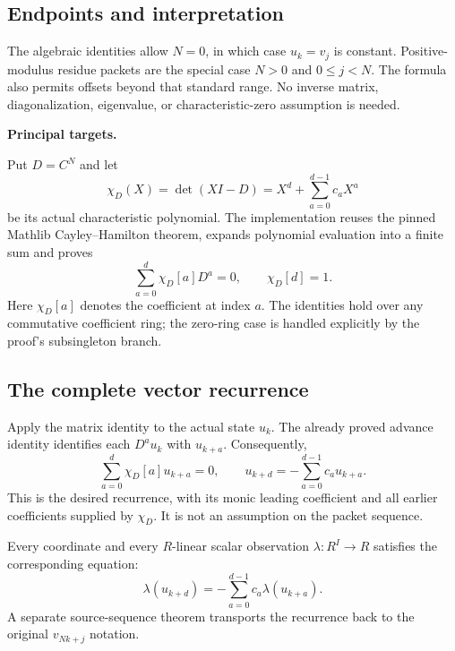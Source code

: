 \subsection*{Endpoints and interpretation}
The algebraic identities allow $N=0$, in which case $u_k=v_j$ is constant. Positive-modulus residue packets are the special case $N>0$ and $0\le j<N$. The formula also permits offsets beyond that standard range. No inverse matrix, diagonalization, eigenvalue, or characteristic-zero assumption is needed.

\textbf{Principal targets.}\par
{}\par
{}\par
{}\par
{}
\par\medskip
{}
Put $D=C^N$ and let
\[
 \chi_D(X)=\det(XI-D)=X^d+\sum_{a=0}^{d-1}c_aX^a
\]
be its actual characteristic polynomial. The implementation reuses the pinned Mathlib Cayley--Hamilton theorem, expands polynomial evaluation into a finite sum and proves
\[
 \sum_{a=0}^{d}\chi_D[a]D^a=0,
 \qquad \chi_D[d]=1.
\]
Here $\chi_D[a]$ denotes the coefficient at index $a$. The identities hold over any commutative coefficient ring; the zero-ring case is handled explicitly by the proof's subsingleton branch.

\subsection*{The complete vector recurrence}
Apply the matrix identity to the actual state $u_k$. The already proved advance identity identifies each $D^a u_k$ with $u_{k+a}$. Consequently,
\[
 \sum_{a=0}^{d}\chi_D[a]u_{k+a}=0,
 \qquad
 \boxed{u_{k+d}=-\sum_{a=0}^{d-1}c_a u_{k+a}.}
\]
This is the desired recurrence, with its monic leading coefficient and all earlier coefficients supplied by $\chi_D$. It is not an assumption on the packet sequence.

Every coordinate and every $R$-linear scalar observation $\lambda:R^I\to R$ satisfies the corresponding equation:
\[
 \lambda(u_{k+d})=-\sum_{a=0}^{d-1}c_a\lambda(u_{k+a}).
\]
A separate source-sequence theorem transports the recurrence back to the original $v_{Nk+j}$ notation.

